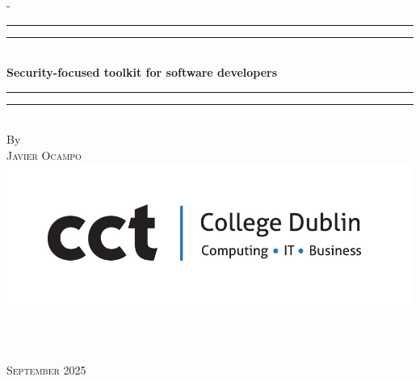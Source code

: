 %
%
\begin{titlingpage}
\begin{SingleSpace}
\calccentering{\unitlength} 
\begin{adjustwidth*}{\unitlength}{-\unitlength}
\vspace*{13mm}
\begin{center}
\rule[0.5ex]{\linewidth}{2pt}\vspace*{-\baselineskip}\vspace*{3.2pt}
\rule[0.5ex]{\linewidth}{1pt}\\[\baselineskip]

\linespread{2.0} \selectfont
%
{\Large \textbf{Security-focused toolkit for software developers}
}

%
\rule[0.5ex]{\linewidth}{1pt}\vspace*{-\baselineskip}\vspace{3.2pt}
\rule[0.5ex]{\linewidth}{2pt}\\
\vspace{6.5mm}
{\large By}\\
\vspace{6.5mm}
{\large\textsc{Javier Ocampo}}\\
\vspace{11mm}
\includegraphics[scale=0.3]{logos/CCT_Logo.jpg}\\
\vspace{6mm}
\vspace{11mm}
\begin{minipage}{10cm}
 \\
\end{minipage}\\
\vspace{9mm}
{\large\textsc{September 2025}}
\vspace{12mm}
\end{center}
\begin{flushright}

\end{flushright}
\end{adjustwidth*}
\end{SingleSpace}
\end{titlingpage}